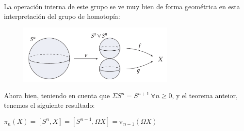 La operación interna de este grupo se ve muy bien de forma geométrica en esta interpretación del grupo de homotopía: \par
\begin{figure}[h]
\centering
\includegraphics[width=0.7\textwidth]{images/ejgruphomot.pdf}
\end{figure}

Ahora bien, teniendo en cuenta que $\Sigma S^n = S^{n+1} \ \forall n \geq 0$, y el teorema anteior, tenemos el siguiente resultado:
\begin{teor}
$\pi_n(X) = [S^n, X] = [S^{n-1}, \Omega X] = \pi_{n-1}(\Omega X)$
\end{teor}